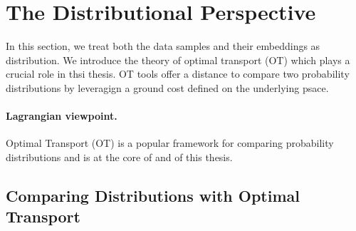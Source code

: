 \section{The Distributional Perspective}\label{sec:dist_perspective_dr}

In this section, we treat both the data samples and their embeddings as distribution. We introduce the theory of optimal transport (OT) which plays a crucial role in thsi thesis. OT tools offer a distance to compare two probability distributions by leveragign a ground cost defined on the underlying psace.

\paragraph{Lagrangian viewpoint.}

Optimal Transport (OT) \citep{villani2009optimal,peyre2019computational} is a popular
framework for comparing probability distributions and is at the core of  and  of this thesis.

\subsection{Comparing Distributions with Optimal Transport}\label{sec:background_ot}


